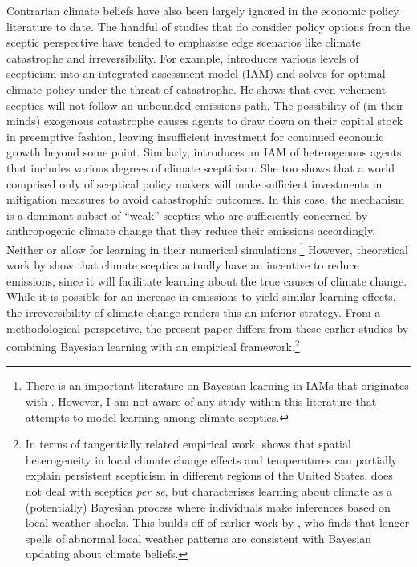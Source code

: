 \documentclass[smallextended]{svjour3}       %
\begin{document}
Contrarian climate beliefs have also been largely ignored in the
economic policy literature to date. The handful of studies that do
consider policy options from the sceptic perspective have tended to
emphasise edge scenarios like climate catastrophe and irreversibility.
For example, \cite{kagan2014septicism} introduces various levels of
scepticism into an integrated assessment model (IAM) and solves for
optimal climate policy under the threat of catastrophe. He shows that
even vehement sceptics will not follow an unbounded emissions path. The
possibility of (in their minds) exogenous catastrophe causes agents to
draw down on their capital stock in preemptive fashion, leaving
insufficient investment for continued economic growth beyond some point.
Similarly, \cite{kiseleva2016heterogeneous} introduces an IAM of
heterogenous agents that includes various degrees of climate scepticism.
She too shows that a world comprised only of sceptical policy makers
will make sufficient investments in mitigation measures to avoid
catastrophic outcomes. In this case, the mechanism is a dominant subset
of ``weak'' sceptics who are sufficiently concerned by anthropogenic
climate change that they reduce their emissions accordingly. Neither
\cite{kagan2014septicism} or \cite{kiseleva2016heterogeneous} allow for
learning in their numerical simulations.\footnote{There is an important
  literature on Bayesian learning in IAMs that originates with
  \cite{kelly1999learning}. However, I am not aware of any study within
  this literature that attempts to model learning among climate
  sceptics.} However, theoretical work by \cite{wijnbergen2015skeptics}
show that climate sceptics actually have an incentive to reduce
emissions, since it will facilitate learning about the true causes of
climate change. While it is possible for an increase in emissions to
yield similar learning effects, the irreversibility of climate change
renders this an inferior strategy. From a methodological perspective,
the present paper differs from these earlier studies by combining
Bayesian learning with an empirical framework.\footnote{In terms of
  tangentially related empirical work, \cite{kaufmann2017spatial} shows
  that spatial heterogeneity in local climate change effects and
  temperatures can partially explain persistent scepticism in different
  regions of the United States. \cite{moore2017learning} does not deal
  with sceptics \emph{per se}, but characterises learning about climate
  as a (potentially) Bayesian process where individuals make inferences
  based on local weather shocks. This builds off of earlier work by
  \cite{deryugina2013update}, who finds that longer spells of abnormal
  local weather patterns are consistent with Bayesian updating about
  climate beliefs.}
\end{document}
